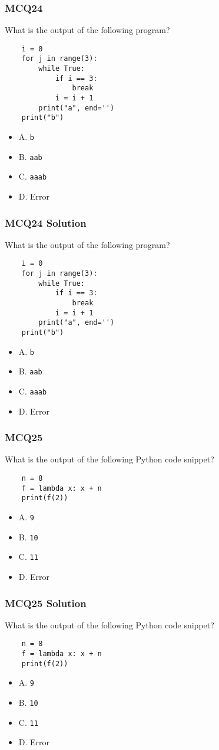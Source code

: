 \documentclass{beamer}
\begin{document}
\begin{frame}[fragile]
    \frametitle{MCQ24}
    What is the output of the following program?
    \begin{verbatim}
    i = 0
    for j in range(3):
        while True:
            if i == 3:
                break
            i = i + 1
        print("a", end='')
    print("b")
    \end{verbatim}
    \begin{itemize}
        \item A. \texttt{b}
        \item B. \texttt{aab}
        \item C. \texttt{aaab}
        \item D. Error
    \end{itemize}
\end{frame}
\begin{frame}[fragile]
    \frametitle{MCQ24 Solution}
    What is the output of the following program?
    \begin{verbatim}
    i = 0
    for j in range(3):
        while True:
            if i == 3:
                break
            i = i + 1
        print("a", end='')
    print("b")
    \end{verbatim}
    \begin{itemize}
        \item A. \texttt{b}
        \item B. \texttt{aab}
        \item \alert{C. \texttt{aaab}}
        \item D. Error
    \end{itemize}
\end{frame}

\begin{frame}[fragile]
    \frametitle{MCQ25}
    What is the output of the following Python code snippet?
    \begin{verbatim}
    n = 8
    f = lambda x: x + n
    print(f(2))
    \end{verbatim}
    \begin{itemize}
        \item A. \texttt{9}
        \item B. \texttt{10}
        \item C. \texttt{11}
        \item D. Error
    \end{itemize}
\end{frame}
\begin{frame}[fragile]
    \frametitle{MCQ25 Solution}
    What is the output of the following Python code snippet?
    \begin{verbatim}
    n = 8
    f = lambda x: x + n
    print(f(2))
    \end{verbatim}
    \begin{itemize}
        \item A. \texttt{9}
        \item \alert{B. \texttt{10}}
        \item C. \texttt{11}
        \item D. Error
    \end{itemize}
\end{frame}
\end{document}
